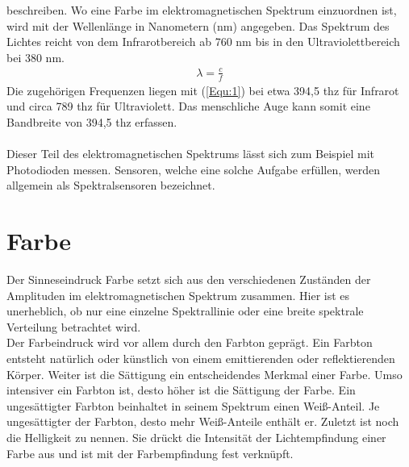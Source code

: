 \documentclass[11pt]{scrartcl}
\begin{document}
beschreiben. Wo eine Farbe im elektromagnetischen Spektrum einzuordnen ist, wird mit der Wellenlänge in Nanometern (nm) angegeben. Das
Spektrum des Lichtes reicht von dem Infrarotbereich ab 760 nm bis in den Ultraviolettbereich bei 380 nm.
\begin{align}\label{Equ:1}
    \lambda = \frac{c}{f}
\end{align}
Die zugehörigen Frequenzen liegen mit (\ref{Equ:1}) bei etwa 394,5 \ac{thz} für Infrarot und circa 789 \ac{thz} für Ultraviolett. Das
menschliche Auge kann somit eine Bandbreite von 394,5 \ac{thz} erfassen.\\
\\
Dieser Teil des elektromagnetischen Spektrums lässt sich zum Beispiel mit Photodioden messen. Sensoren, welche eine solche Aufgabe erfüllen,
werden allgemein als Spektralsensoren bezeichnet.
\clearpage

\section{Farbe}
Der Sinneseindruck Farbe setzt sich aus den verschiedenen Zuständen der Amplituden im elektromagnetischen Spektrum zusammen. Hier ist es
unerheblich, ob nur eine einzelne Spektrallinie oder eine breite spektrale Verteilung betrachtet wird.\\
Der Farbeindruck wird vor allem durch den Farbton geprägt. Ein Farbton entsteht natürlich oder künstlich von einem emittierenden oder
reflektierenden Körper. Weiter ist die Sättigung ein entscheidendes Merkmal einer Farbe. Umso intensiver ein Farbton ist, desto höher ist
die Sättigung der Farbe. Ein ungesättigter Farbton beinhaltet in seinem Spektrum einen Weiß-Anteil. Je ungesättigter der Farbton, desto
mehr Weiß-Anteile enthält er. Zuletzt ist noch die Helligkeit zu nennen. Sie drückt die Intensität der Lichtempfindung einer Farbe aus und
ist mit der Farbempfindung fest verknüpft.
\end{document}
